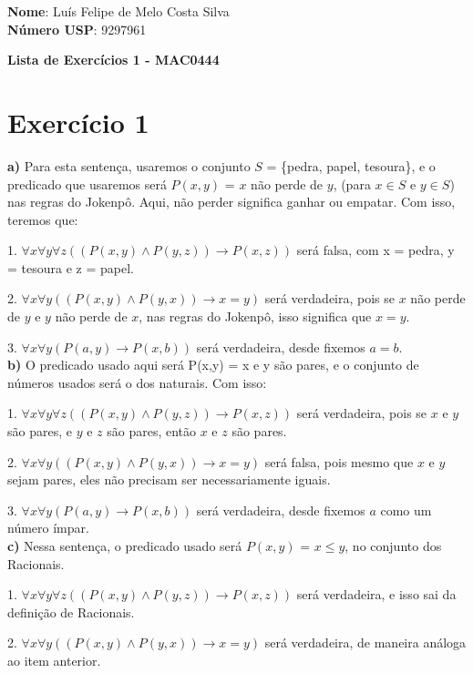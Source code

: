 \documentclass[12pt,letterpaper]{article}
\begin{document}
	
	\large \textbf{Nome}: Luís Felipe de Melo Costa Silva \\
	\textbf{Número USP}: 9297961 
    
	\begin{center}
		\LARGE \bf
		Lista de Exercícios 1 - MAC0444
	\end{center}
	
	\section*{Exercício 1}
	
	\textbf{a)} Para esta sentença, usaremos o conjunto $S$ = \{pedra, papel, tesoura\}, e o predicado que usaremos será $P(x,y)$ = $x$ não perde de $y$, (para $x \in S$ e $y \in S$) nas regras do Jokenpô. Aqui, não perder significa ganhar ou empatar. Com isso, teremos que:
	
	1. $\forall x \forall y \forall z((P(x,y)\land P(y,z)) \to P(x, z))$ será falsa, com x = pedra, y = tesoura e z = papel.
	
	2. $\forall x \forall y((P(x,y) \land P (y,x)) \to x=y)$ será verdadeira, pois se $x$ não perde de $y$ e $y$ não perde de $x$, nas regras do Jokenpô, isso significa que $x=y$.
	
	3. $\forall x\forall y(P(a,y) \to P(x,b))$ será verdadeira, desde fixemos $a = b$.\\
	
	\textbf{b)} O predicado usado aqui será P(x,y) = x e y são pares, e o conjunto de números usados será o dos naturais. Com isso:
	
	1. $\forall x \forall y \forall z((P(x,y)\land P(y,z)) \to P(x, z))$ será verdadeira, pois se $x$ e $y$ são pares, e $y$ e $z$ são pares, então $x$ e $z$ são pares.
	
	2. $\forall x \forall y((P(x,y) \land P (y,x)) \to x=y)$ será falsa, pois mesmo que $x$ e $y$ sejam pares, eles não precisam ser necessariamente iguais.
		
	3. $\forall x\forall y(P(a,y) \to P(x,b))$ será verdadeira, desde fixemos $a$ como um número ímpar.\\
	
	\textbf{c)} Nessa sentença, o predicado usado será $P(x,y)$ = $x \leq y$, no conjunto dos Racionais.
	
	1. $\forall x \forall y \forall z((P(x,y)\land P(y,z)) \to P(x, z))$ será verdadeira, e isso sai da definição de Racionais.
	
	2. $\forall x \forall y((P(x,y) \land P (y,x)) \to x=y)$ será verdadeira, de maneira análoga ao item anterior.
	
\end{document}
